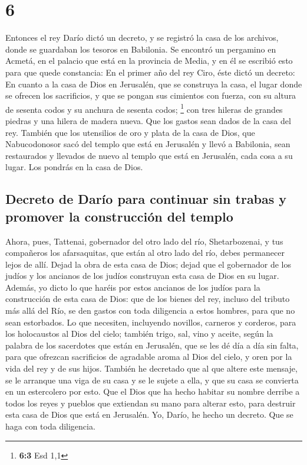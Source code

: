 \hypertarget{section-5}{%
\section{6}\label{section-5}}

 Entonces el rey Darío dictó un decreto, y se registró la
casa de los archivos, donde se guardaban los tesoros en Babilonia.
 Se encontró un pergamino en Acmetá, en el palacio que
está en la provincia de Media, y en él se escribió esto para que quede
constancia:  En el primer año del rey Ciro, éste dictó un
decreto: En cuanto a la casa de Dios en Jerusalén, que se construya la
casa, el lugar donde se ofrecen los sacrificios, y que se pongan sus
cimientos con fuerza, con su altura de sesenta codos y su anchura de
sesenta codos; \footnote{\textbf{6:3} Esd 1,1}  con tres
hileras de grandes piedras y una hilera de madera nueva. Que los gastos
sean dados de la casa del rey.  También que los utensilios
de oro y plata de la casa de Dios, que Nabucodonosor sacó del templo que
está en Jerusalén y llevó a Babilonia, sean restaurados y llevados de
nuevo al templo que está en Jerusalén, cada cosa a su lugar. Los pondrás
en la casa de Dios.

\hypertarget{decreto-de-daruxedo-para-continuar-sin-trabas-y-promover-la-construcciuxf3n-del-templo}{%
\subsection{Decreto de Darío para continuar sin trabas y promover la
construcción del
templo}\label{decreto-de-daruxedo-para-continuar-sin-trabas-y-promover-la-construcciuxf3n-del-templo}}

 Ahora, pues, Tattenai, gobernador del otro lado del río,
Shetarbozenai, y tus compañeros los afarsaquitas, que están al otro lado
del río, debes permanecer lejos de allí.  Dejad la obra de
esta casa de Dios; dejad que el gobernador de los judíos y los ancianos
de los judíos construyan esta casa de Dios en su lugar. 
Además, yo dicto lo que haréis por estos ancianos de los judíos para la
construcción de esta casa de Dios: que de los bienes del rey, incluso
del tributo más allá del Río, se den gastos con toda diligencia a estos
hombres, para que no sean estorbados.  Lo que necesiten,
incluyendo novillos, carneros y corderos, para los holocaustos al Dios
del cielo; también trigo, sal, vino y aceite, según la palabra de los
sacerdotes que están en Jerusalén, que se les dé día a día sin falta,
 para que ofrezcan sacrificios de agradable aroma al Dios
del cielo, y oren por la vida del rey y de sus hijos. 
También he decretado que al que altere este mensaje, se le arranque una
viga de su casa y se le sujete a ella, y que su casa se convierta en un
estercolero por esto.  Que el Dios que ha hecho habitar
su nombre derribe a todos los reyes y pueblos que extiendan su mano para
alterar esto, para destruir esta casa de Dios que está en Jerusalén. Yo,
Darío, he hecho un decreto. Que se haga con toda diligencia.

